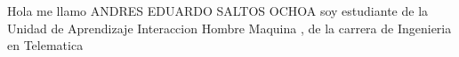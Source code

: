 \documentclass[a4paper,openright,10pt]{book}
\begin{document}
Hola me llamo ANDRES EDUARDO SALTOS OCHOA soy estudiante de la
  Unidad de Aprendizaje Interaccion Hombre Maquina , de la carrera de  Ingenieria en Telematica
\end{document}
